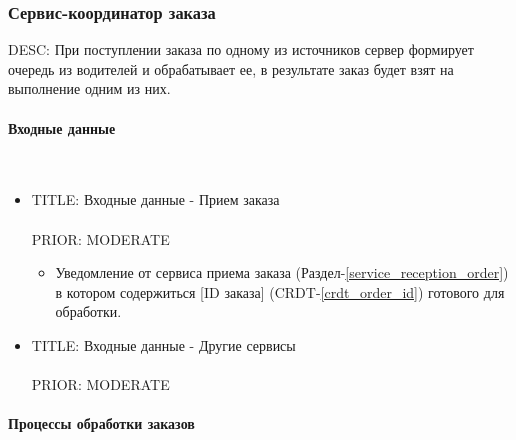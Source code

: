 \subsubsection{Сервис-координатор заказа} \label{selection_drivers_for_the_order}

    DESC:  При поступлении заказа по одному из источников сервер формирует очередь из водителей и обрабатывает ее, в результате заказ будет взят на выполнение одним из них. 

    \paragraph{Входные данные} \mbox{} \\ \label{}

	  \begin{itemize}

	    \item{

	      TITLE: Входные данные - Прием заказа\\
	      \\
	      PRIOR: MODERATE\\

	    }

		    \begin{itemize}
		      \item Уведомление от сервиса приема заказа (Раздел-\ref{service_reception_order}) в котором содержиться [ID заказа] (CRDT-\ref{crdt_order_id}) готового для обработки.
		    \end{itemize}

	    \item{

	      TITLE: Входные данные - Другие сервисы\\
	      \\
	      PRIOR: MODERATE\\

	    }

	  \end{itemize}


	\paragraph{Процессы обработки заказов} \mbox{} \\
     
    
    

    

    